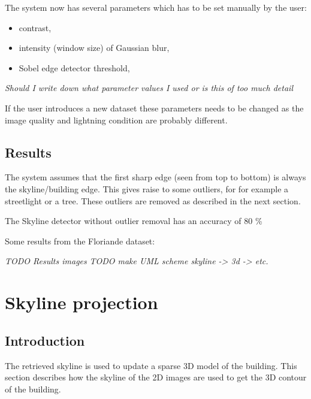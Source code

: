 \documentclass[10pt]{article}
\begin{document}
The system now has several parameters which has to be set manually by the user:
\begin{itemize}
	\item contrast,
	\item intensity (window size) of Gaussian blur,
	\item Sobel edge detector threshold,
\end{itemize}
\textit{Should I write down what parameter values I used or is this of too much
detail}

If the user introduces a new dataset these parameters needs to be changed
as the image quality and lightning condition are probably different.

 \subsection{Results}%
The system assumes that the first sharp edge (seen from top to bottom) is
always the skyline/building edge. This gives raise to some outliers, for 
for example a streetlight or a tree. These outliers are removed as described in
the next section.  

The Skyline detector without outlier removal has an accuracy of 80 \% 

Some results from the Floriande dataset:





\textit{ TODO Results images}
\textit{ TODO make UML scheme skyline -> 3d -> etc.}
\\

\section{Skyline projection}
 \subsection{Introduction}
The retrieved skyline is used to update a sparse 3D model of the building.
This section describes how the skyline of the 2D images are used to get the 3D contour of the building. 
\end{document}
